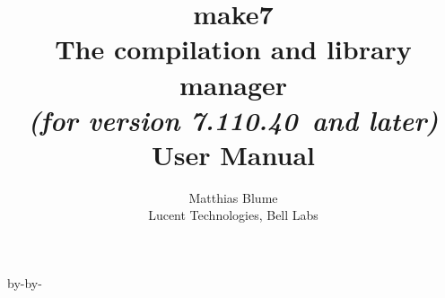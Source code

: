 \usepackage{times}
\usepackage{hyperref}

\advance\topmargin by-\headheight\advance\topmargin by-\headsep
\textwidth6.7in

\newcommand{\smlmj}{110}
\newcommand{\smlmn}{40}

\author{Matthias Blume \\
Lucent Technologies, Bell Labs}

\title{{\bf make7}\\
The compilation and library manager \\
{\it\small (for version 7.\smlmj.\smlmn~and later)} \\
User Manual}

\setlength{\parindent}{0pt}
\setlength{\parskip}{6pt plus 3pt minus 2pt}

\newcommand{\nt}[1]{{\it #1}}
\newcommand{\tl}[1]{{\underline{\bf #1}}}
\newcommand{\ttl}[1]{{\underline{\tt #1}}}
\newcommand{\ar}{$\rightarrow$\ }
\newcommand{\vb}{~$|$~}





\maketitle

\pagebreak

\tableofcontents

\pagebreak



















\pagebreak

\appendix









\pagebreak





